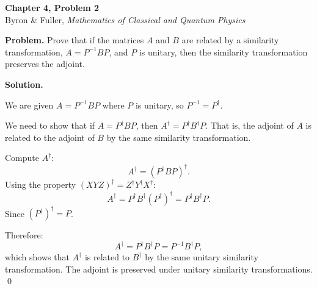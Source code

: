 \documentclass[12pt]{article}
\begin{document}
\begin{center}
{\Large\bfseries Chapter 4, Problem 2}\\[6pt]
Byron \& Fuller, \textit{Mathematics of Classical and Quantum Physics}
\end{center}

\bigskip

\textbf{Problem.} Prove that if the matrices $A$ and $B$ are related by a similarity transformation, $A = P^{-1}BP$, and $P$ is unitary, then the similarity transformation preserves the adjoint.

\bigskip
\textbf{Solution.}

We are given $A = P^{-1}BP$ where $P$ is unitary, so $P^{-1} = P^\dagger$.

We need to show that if $A = P^\dagger B P$, then $A^\dagger = P^\dagger B^\dagger P$. That is, the adjoint of $A$ is related to the adjoint of $B$ by the same similarity transformation.

Compute $A^\dagger$:
\[
A^\dagger = (P^\dagger B P)^\dagger.
\]
Using the property $(XYZ)^\dagger = Z^\dagger Y^\dagger X^\dagger$:
\[
A^\dagger = P^\dagger B^\dagger (P^\dagger)^\dagger = P^\dagger B^\dagger P.
\]
Since $(P^\dagger)^\dagger = P$.

Therefore:
\[
A^\dagger = P^\dagger B^\dagger P = P^{-1} B^\dagger P,
\]
which shows that $A^\dagger$ is related to $B^\dagger$ by the same unitary similarity transformation. The adjoint is preserved under unitary similarity transformations. \qed
\end{document}
